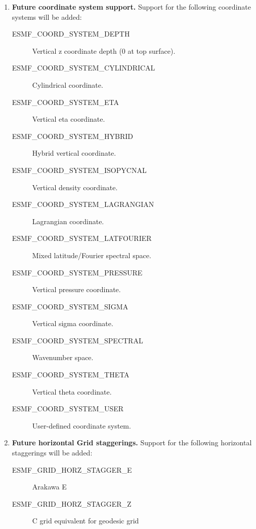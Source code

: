 \begin{enumerate}
\item {\bf Future coordinate system support.}  Support for the following
coordinate systems will be added:
 \begin{description}
    \item [ESMF\_COORD\_SYSTEM\_DEPTH]
          Vertical z coordinate depth (0 at top surface).
    \item [ESMF\_COORD\_SYSTEM\_CYLINDRICAL]
          Cylindrical coordinate.
    \item [ESMF\_COORD\_SYSTEM\_ETA]
          Vertical eta coordinate.
    \item [ESMF\_COORD\_SYSTEM\_HYBRID]
          Hybrid vertical coordinate.
    \item [ESMF\_COORD\_SYSTEM\_ISOPYCNAL]
          Vertical density coordinate.
    \item [ESMF\_COORD\_SYSTEM\_LAGRANGIAN]
          Lagrangian coordinate.
    \item [ESMF\_COORD\_SYSTEM\_LATFOURIER]
          Mixed latitude/Fourier spectral space.
    \item [ESMF\_COORD\_SYSTEM\_PRESSURE]
          Vertical pressure coordinate.
    \item [ESMF\_COORD\_SYSTEM\_SIGMA]
          Vertical sigma coordinate.
    \item [ESMF\_COORD\_SYSTEM\_SPECTRAL]
          Wavenumber space.
    \item [ESMF\_COORD\_SYSTEM\_THETA]
          Vertical theta coordinate.
    \item [ESMF\_COORD\_SYSTEM\_USER]
          User-defined coordinate system.
 \end{description}

\item {\bf Future horizontal Grid staggerings.}  Support for the following
horizontal staggerings will be added:
 \begin{description}
    \item [ESMF\_GRID\_HORZ\_STAGGER\_E]
          Arakawa E
    \item [ESMF\_GRID\_HORZ\_STAGGER\_Z]
          C grid equivalent for geodesic grid
 \end{description}


\end{enumerate}
